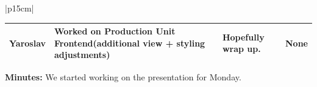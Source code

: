 \begin{table}[H]
    \centering
    \begin{tabular}{|p{15cm}|} 
        \hline
        \begin{table}[H]
            \begin{tabular}{|p{1.75cm}|p{4cm}|p{4cm}|p{4cm}|}
                \hline
                \cellcolor[HTML]{d4d4d4} Yaroslav & Worked on Production Unit Frontend(additional view + styling adjustments) & Hopefully wrap up. & None \\
                \hline
            \end{tabular}
        \end{table}
        \textbf{Minutes:} We started working on the presentation for Monday. \\
        \hline
    \end{tabular}
\end{table}


